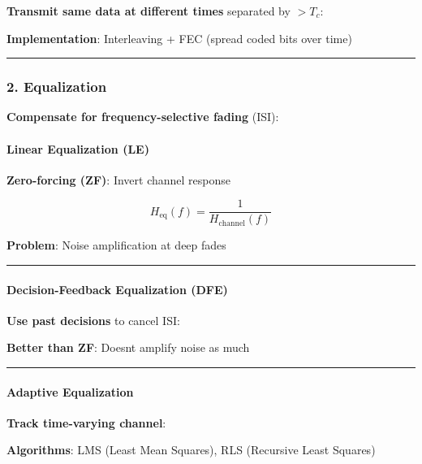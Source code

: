 \textbf{Transmit same data at different times} separated by \(> T_c\):

\textbf{Implementation}: Interleaving + FEC (spread coded bits over
time)

\begin{center}\rule{0.5\linewidth}{0.5pt}\end{center}

\subsubsection{2. Equalization}\label{equalization}

\textbf{Compensate for frequency-selective fading} (ISI):

\paragraph{Linear Equalization (LE)}\label{linear-equalization-le}

\textbf{Zero-forcing (ZF)}: Invert channel response

\[
H_{\text{eq}}(f) = \frac{1}{H_{\text{channel}}(f)}
\]

\textbf{Problem}: Noise amplification at deep fades

\begin{center}\rule{0.5\linewidth}{0.5pt}\end{center}

\paragraph{Decision-Feedback Equalization
(DFE)}\label{decision-feedback-equalization-dfe}

\textbf{Use past decisions} to cancel ISI:

\textbf{Better than ZF}: Doesn\textquotesingle t amplify noise as much

\begin{center}\rule{0.5\linewidth}{0.5pt}\end{center}

\paragraph{Adaptive Equalization}\label{adaptive-equalization}

\textbf{Track time-varying channel}:

\textbf{Algorithms}: LMS (Least Mean Squares), RLS (Recursive Least
Squares)

